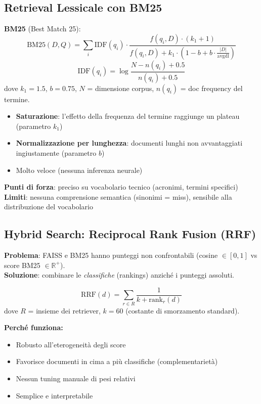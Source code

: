 \documentclass[12pt,a4paper]{article}
\begin{document}
\subsection{Retrieval Lessicale con BM25}\label{sec:bm25-lab}

\begin{formulabox}
\textbf{BM25} (Best Match 25):
\[
\text{BM25}(D,Q) = \sum_{i} \text{IDF}(q_i) \cdot \frac{f(q_i,D) \cdot (k_1+1)}{f(q_i,D) + k_1 \cdot \left(1 - b + b \cdot \frac{|D|}{\text{avgdl}}\right)}
\]
\[
\text{IDF}(q_i) = \log\frac{N - n(q_i) + 0.5}{n(q_i) + 0.5}
\]
dove $k_1 = 1.5$, $b = 0.75$, $N$ = dimensione corpus, $n(q_i)$ = doc frequency del termine.
\end{formulabox}

\begin{itemize}
  \item \textbf{Saturazione}: l'effetto della frequenza del termine raggiunge un plateau (parametro $k_1$)
  \item \textbf{Normalizzazione per lunghezza}: documenti lunghi non avvantaggiati ingiustamente (parametro $b$)
  \item Molto veloce (nessuna inferenza neurale)
\end{itemize}

\textbf{Punti di forza}: preciso su vocabolario tecnico (acronimi, termini specifici)\\
\textbf{Limiti}: nessuna comprensione semantica (sinonimi = miss), sensibile alla distribuzione del vocabolario

\subsection{Hybrid Search: Reciprocal Rank Fusion (RRF)}\label{sec:rrf-lab}

\begin{defbox}
\textbf{Problema}: FAISS e BM25 hanno punteggi non confrontabili (cosine $\in [0,1]$ vs score BM25 $\in \mathbb{R}^+$).\\
\textbf{Soluzione}: combinare le \emph{classifiche} (rankings) anzich\'e i punteggi assoluti.
\end{defbox}

\begin{formulabox}
\[
\text{RRF}(d) = \sum_{r \in R} \frac{1}{k + \text{rank}_r(d)}
\]
dove $R$ = insieme dei retriever, $k = 60$ (costante di smorzamento standard).
\end{formulabox}

\textbf{Perch\'e funziona:}
\begin{itemize}
  \item Robusto all'eterogeneit\`a degli score
  \item Favorisce documenti in cima a pi\`u classifiche (complementariet\`a)
  \item Nessun tuning manuale di pesi relativi
  \item Semplice e interpretabile
\end{itemize}
\end{document}
